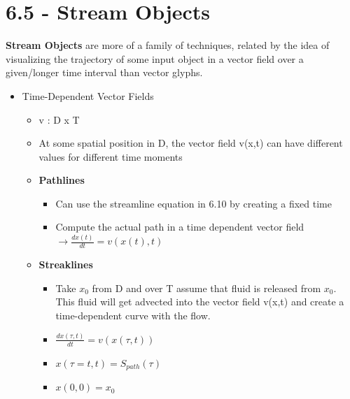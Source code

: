 \documentclass{article}
\begin{document}
\section*{6.5 - Stream Objects}
\textbf{Stream Objects} are more of a family of techniques, related by the idea of visualizing the trajectory of some input object in a vector field over a given/longer time interval than vector glyphs.

\begin{itemize}
    \item Time-Dependent Vector Fields
    \begin{itemize}
        \item v : D x T
        \item At some spatial position in D, the vector field v(x,t) can have different values for different time moments
        \item \textbf{Pathlines}
        \begin{itemize}
            \item Can use the streamline equation in 6.10 by creating a fixed time
            \item Compute the actual path in a time dependent vector field $\rightarrow \frac{dx(t)}{dt} = v(x(t), t)$
        \end{itemize}
        \item \textbf{Streaklines}
        \begin{itemize}
            \item Take $x_0$ from D and over T assume that fluid is released from $x_0$. This fluid will get advected into the vector field v(x,t) and create a time-dependent curve with the flow.
            \item $\frac{dx(\tau, t)}{dt} = v(x(\tau, t))$
            \item $x(\tau = t, t) = S_{path}(\tau)$
            \item $x(0, 0) = x_0$
        \end{itemize}
    \end{itemize}
     

\end{itemize}
\end{document}
